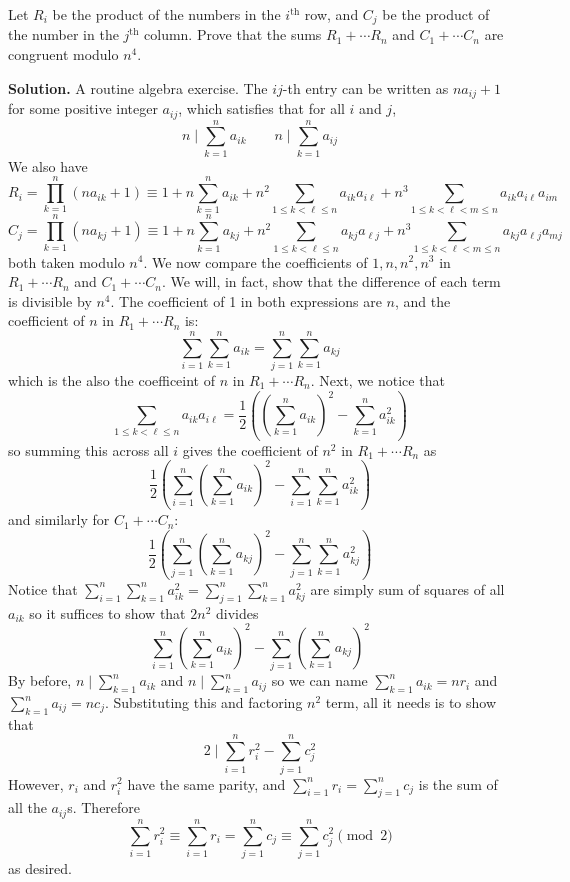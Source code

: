 \documentclass[11pt,a4paper]{article}
\begin{document}
\begin{enumerate}
	Let $R_i$ be the product of the numbers in the $i^{\text{th}}$ row, and $C_j$ be the product of the number in the $j^{\text{th}}$ column. Prove that the sums $R_1+\cdots R_n$ and $C_1+\cdots C_n$ are congruent modulo $n^4$.
	
	\textbf{Solution.} A routine algebra exercise. The $ij$-th entry can be written as $na_{ij}+1$ for some positive integer $a_{ij}$, which satisfies that for all $i$ and $j$, 
	\[
	n\mid \displaystyle\sum_{k=1}^n a_{ik}\qquad
	n\mid \displaystyle\sum_{k=1}^n a_{ij}
	\]
	We also have 
	\[
	R_i = \displaystyle\prod_{k=1}^n (na_{ik}+1)
	\equiv 1 + n\displaystyle\sum_{k=1}^n a_{ik} + n^2 \displaystyle\sum_{1\le k<\ell\le n} a_{ik}a_{i\ell}
	+n^3 \displaystyle\sum_{1\le k<\ell<m\le n} a_{ik}a_{i\ell}a_{im}
	\]\[
	C_j = \displaystyle\prod_{k=1}^n (na_{kj}+1)
	\equiv 1 + n\displaystyle\sum_{k=1}^n a_{kj} + n^2 \displaystyle\sum_{1\le k<\ell\le n} a_{kj}a_{\ell j}
	+n^3 \displaystyle\sum_{1\le k<\ell<m\le n} a_{kj}a_{\ell j}a_{mj}
	\]
	both taken modulo $n^4$. 
	We now compare the coefficients of $1, n, n^2, n^3$ in $R_1+\cdots R_n$ and $C_1+\cdots C_n$. 
	We will, in fact, show that the difference of each term is divisible by $n^4$. 
	The coefficient of 1 in both expressions are $n$, and the coefficient of $n$ in $R_1+\cdots R_n$ is: 
	\[
	\displaystyle\sum_{i=1}^n \displaystyle\sum_{k=1}^n a_{ik}
	=\displaystyle\sum_{j=1}^n \displaystyle\sum_{k=1}^n a_{kj}
	\]
	which is the also the coefficeint of $n$ in $R_1+\cdots R_n$. 
	Next, we notice that 
	\[
	\displaystyle\sum_{1\le k<\ell\le n} a_{ik}a_{i\ell}
	=\frac 12 \left((\displaystyle\sum_{k=1}^n a_{ik})^2 - \displaystyle\sum_{k=1}^n a_{ik}^2\right)
	\]
	so summing this across all $i$ gives the coefficient of $n^2$ in $R_1+\cdots R_n$ as 
	\[
	\frac 12 \left(\displaystyle\sum_{i=1}^n(\displaystyle\sum_{k=1}^n a_{ik})^2 - \displaystyle\sum_{i=1}^n\displaystyle\sum_{k=1}^n a_{ik}^2\right)
	\]
	and similarly for $C_1+\cdots C_n$: 
	\[
	\frac 12 \left(\displaystyle\sum_{j=1}^n(\displaystyle\sum_{k=1}^n a_{kj})^2 - \displaystyle\sum_{j=1}^n\displaystyle\sum_{k=1}^n a_{kj}^2\right)
	\]
	Notice that $\displaystyle\sum_{i=1}^n\displaystyle\sum_{k=1}^n a_{ik}^2=\displaystyle\sum_{j=1}^n\displaystyle\sum_{k=1}^n a_{kj}^2$ are simply sum of squares of all $a_{ik}$ so it suffices to show that $2n^2$ divides 
	\[
	\displaystyle\sum_{i=1}^n(\displaystyle\sum_{k=1}^n a_{ik})^2
	-\displaystyle\sum_{j=1}^n(\displaystyle\sum_{k=1}^n a_{kj})^2
	\]
	By before, $n\mid \displaystyle\sum_{k=1}^n a_{ik}$ and $n\mid \displaystyle\sum_{k=1}^n a_{ij}$ so we can name $\displaystyle\sum_{k=1}^n a_{ik}=nr_i$ and $\displaystyle\sum_{k=1}^n a_{ij}=nc_j$. Substituting this and factoring $n^2$ term, all it needs is to show that 
	\[
	2\mid \displaystyle\sum_{i=1}^n r_i^2
	-\displaystyle\sum_{j=1}^n c_j^2
	\]
	However, $r_i$ and $r_i^2$ have the same parity, and $\displaystyle\sum_{i=1}^n r_i=\displaystyle\sum_{j=1}^n c_j$ is the sum of all the $a_{ij}$s. Therefore 
	\[
	 \displaystyle\sum_{i=1}^n r_i^2\equiv \displaystyle\sum_{i=1}^n r_i=\displaystyle\sum_{j=1}^n c_j
	 \equiv \displaystyle\sum_{j=1}^n c_j^2\pmod{2}
	\]
	as desired. 
	

\end{enumerate}
\end{document}
